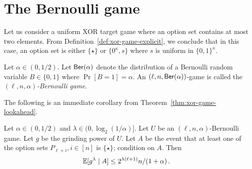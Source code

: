 
\section{The Bernoulli game}

    Let us consider a uniform XOR target game where an option set 
    contains at most two elements. 
    From Definition~\ref{def:xor-game-explicit}, 
    we conclude that in this case, 
    an option set is either $\{\star\}$ 
    or $\{0^\kappa, s\}$ where $s$ is uniform in $\{0,1\}^\kappa$.


    \begin{definition}
        \label{def:static-game}\label{def:Bernoulli-game}
        Let $\alpha \in (0, 1/2)$. 
        Let $\mathsf{Ber}(\alpha)$ denote the distribution of a Bernoulli random variable 
        $B \in \{0,1\}$ where $\Pr[B = 1] = \alpha$.
        An $(\ell, n, \mathsf{Ber}(\alpha))$-game 
        is called the \emph{$(\ell, n, \alpha)$-Bernoulli game}.
    \end{definition}
    The following is an immediate corollary from Theorem~\ref{thm:xor-game-lookahead}.

    \begin{theorem}\label{thm:xor-game-playornot}
        Let $\alpha \in (0, 1/2)$ and $\lambda \in (0, \log_2(1/\alpha)]$. 
        Let $U$ be an $(\ell, n, \alpha)$-Bernoulli game. 
        Let $g$ be the grinding power of $U$. 
        Let $A$ be the event that 
        at least one of the option sets $P_{\ell + i}, i \in [n]$ is $\{\star\}$; 
        condition on $A$. 
        Then 
        $$
            \operatorname{\mathbb{E}} [g^\lambda \mid A] \leq 2^{\lambda(\ell + 1)} n/(1+\alpha)
            \,.
        $$
    \end{theorem}

